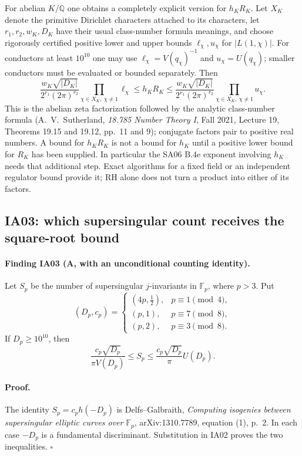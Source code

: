 \documentclass[11pt,a4paper]{article}
\theoremstyle{definition}
\begin{document}
For abelian $K/\mathbb Q$ one obtains a completely explicit version for
$h_KR_K$.  Let $X_K$ denote the primitive Dirichlet characters attached
to its characters, let $r_1,r_2,w_K,D_K$ have their usual class-number
formula meanings, and choose rigorously certified positive lower and
upper bounds $\ell_\chi,u_\chi$ for $|L(1,\chi)|$.  For conductors at
least $10^{10}$ one may use $\ell_\chi=V(q_\chi)^{-1}$ and
$u_\chi=U(q_\chi)$; smaller conductors must be evaluated or bounded
separately.  Then
\[
 \frac{w_K\sqrt{|D_K|}}{2^{r_1}(2\pi)^{r_2}}
 \prod_{\chi\in X_K,\ \chi\ne1}\ell_\chi
 \leq h_KR_K\leq
 \frac{w_K\sqrt{|D_K|}}{2^{r_1}(2\pi)^{r_2}}
 \prod_{\chi\in X_K,\ \chi\ne1}u_\chi.
\]
This is the abelian zeta factorization followed by the analytic
class-number formula (A.~V.~Sutherland, \emph{18.785 Number Theory I},
Fall 2021, Lecture 19, Theorems 19.15 and 19.12, pp.~11 and 9);
conjugate factors pair to positive real numbers.
A bound for $h_KR_K$ is not a bound for $h_K$ until a positive lower
bound for $R_K$ has been supplied.  In particular the SA06 B.4e
exponent involving $h_K$ needs that additional step.  Exact algorithms
for a fixed field or an independent regulator bound provide it; RH
alone does not turn a product into either of its factors.

\subsection{IA03: which supersingular count receives the square-root bound}

\paragraph{Finding IA03 (A, with an unconditional counting identity).}
Let $S_p$ be the number of supersingular $j$-invariants in
$\mathbb F_p$, where $p>3$.  Put
\[
 (D_p,c_p)=
 \begin{cases}
 (4p,\tfrac12),&p\equiv1\pmod4,\\
 (p,1),&p\equiv7\pmod8,\\
 (p,2),&p\equiv3\pmod8.
 \end{cases}
\]
If $D_p\geq10^{10}$, then
\[
 \frac{c_p\sqrt{D_p}}{\pi V(D_p)}
 \leq S_p\leq\frac{c_p\sqrt{D_p}}{\pi}U(D_p).
\]
\paragraph{Proof.}
The identity $S_p=c_ph(-D_p)$ is Delfs--Galbraith,
\emph{Computing isogenies between supersingular elliptic curves over
$\mathbb F_p$}, arXiv:1310.7789, equation (1), p.~2.
In each case $-D_p$ is a fundamental discriminant.  Substitution in
IA02 proves the two inequalities. \hfill$\square$
\end{document}
